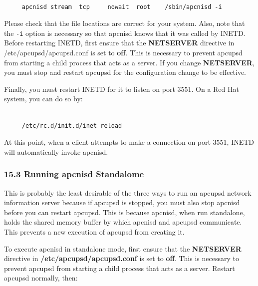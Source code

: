 {{{{{{{{{{\footnotesize
\begin{verbatim}
     
     apcnisd stream  tcp     nowait  root    /sbin/apcnisd -i
\end{verbatim}
\normalsize

Please check that the file locations are correct for your system. Also, note
that the {\tt -i} option is necessary so that apcnisd knows that it was called
by INETD. Before restarting INETD, first ensure that the {\bf NETSERVER}
directive in /etc/apcupsd/apcupsd.conf is set to {\bf off}. This is necessary
to prevent apcupsd from starting a child process that acts as a server. If you
change {\bf NETSERVER}, you must stop and restart apcupsd for the
configuration change to be effective.  

Finally, you must restart INETD for it to listen on port 3551. On a Red Hat
system, you can do so by: 

\footnotesize
\begin{verbatim}
     
     /etc/rc.d/init.d/inet reload
\end{verbatim}
\normalsize

At this point, when a client attempts to make a connection on port 3551, INETD
will automatically invoke apcnisd. 

\label{Running-apcnisd-Standalome}

\subsubsection*{15.3 Running apcnisd Standalome}

This is probably the least desirable of the three ways to run an apcupsd
network information server because if apcupsd is stopped, you must also stop
apcnisd before you can restart apcupsd. This is because apcnisd, when run
standalone, holds the shared memory buffer by which apcnisd and apcupsd
communicate. This prevents a new execution of apcupsd from creating it.  

To execute apcnisd in standalone mode, first ensure that the {\bf NETSERVER}
directive in {\bf /etc/apcupsd/apcupsd.conf} is set to {\bf off}. This is
necessary to prevent apcupsd from starting a child process that acts as a
server. Restart apcupsd normally, then: 

\footnotesize
\begin{verbatim}
     

\end{verbatim}}}}}}}}}}}

